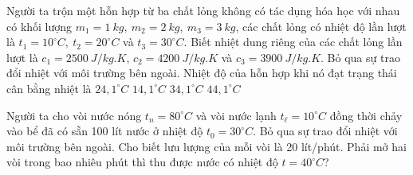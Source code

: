 \begin{ex} 
	Người ta trộn một hỗn hợp từ ba chất lỏng không có tác dụng hóa học với nhau có khối lượng $m_1=1 \ kg, \ m_2=2 \ kg, \ m_3=3 \ kg$, các chất lỏng có nhiệt độ lần lượt là $t_1=10^\circ C,\ t_2=20^\circ C$ và $t_3=30^\circ C$. Biết nhiệt dung riêng của các chất lỏng lần lượt là $c_1=2500 \ J/kg.K$, $c_2=4200 \ J/kg.K$ và $c_3=3900 \ J/kg.K$.  Bỏ qua sự trao đổi nhiệt với môi trường bên ngoài. Nhiệt độ của hỗn hợp khi nó đạt trạng thái cân bằng nhiệt là
	\choice
	{\True $24,1^\circ C$}
	{$14,1^\circ C$}
	{$34,1^\circ C$}
	{$44,1^\circ C$}
\end{ex}


\begin{ex} 
	Người ta cho vòi nước nóng $t_{n}=80^\circ C$ và vòi nước lạnh $t_{\ell}=10^\circ C$ đồng thời chảy vào bể đã có sẵn 100 lít nước ở nhiệt độ $t_0=30^\circ C$. Bỏ qua sự trao đổi nhiệt với môi trường bên ngoài.  Cho biết lưu lượng của mỗi vòi là 20 lít/phút. Phải mở hai vòi trong bao nhiêu phút thì thu được nước có nhiệt độ $t=40^\circ C$?
\end{ex}


